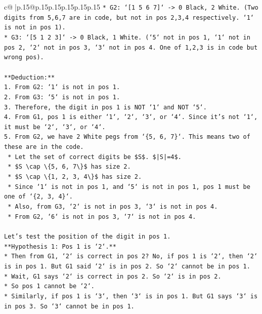\documentclass{article}
\begin{document}
{\begin{supertabular}{c@{$\;$}|p{.15\linewidth}@{}p{.15\linewidth}p{.15\linewidth}p{.15\linewidth}p{.15\linewidth}p{.15\linewidth}}
{{{\texttt{*   G2: `{[}1 5 6 7{]}` {-}> 0 Black, 2 White. (Two digits from 5,6,7 are in code, but not in pos 2,3,4 respectively. `1` is not in pos 1).} \\
\texttt{*   G3: `{[}5 1 2 3{]}` {-}> 0 Black, 1 White. (`5` not in pos 1, `1` not in pos 2, `2` not in pos 3, `3` not in pos 4. One of 1,2,3 is in code but wrong pos).} \\
\\ 
\texttt{**Deduction:**} \\
\texttt{1.  From G2: `1` is not in pos 1.} \\
\texttt{2.  From G3: `5` is not in pos 1.} \\
\texttt{3.  Therefore, the digit in pos 1 is NOT `1` and NOT `5`.} \\
\texttt{4.  From G1, pos 1 is either `1`, `2`, `3`, or `4`. Since it's not `1`, it must be `2`, `3`, or `4`.} \\
\texttt{5.  From G2, we have 2 White pegs from `\{5, 6, 7\}`. This means two of these are in the code.} \\
\texttt{    *   Let the set of correct digits be \$S\$. \$|S|=4\$.} \\
\texttt{    *   \$S \textbackslash{}cap \textbackslash{}\{5, 6, 7\textbackslash{}\}\$ has size 2.} \\
\texttt{    *   \$S \textbackslash{}cap \textbackslash{}\{1, 2, 3, 4\textbackslash{}\}\$ has size 2.} \\
\texttt{    *   Since `1` is not in pos 1, and `5` is not in pos 1, pos 1 must be one of `\{2, 3, 4\}`.} \\
\texttt{    *   Also, from G3, `2` is not in pos 3, `3` is not in pos 4.} \\
\texttt{    *   From G2, `6` is not in pos 3, `7` is not in pos 4.} \\
\\ 
\texttt{Let's test the position of the digit in pos 1.} \\
\texttt{**Hypothesis 1: Pos 1 is `2`.**} \\
\texttt{*   Then from G1, `2` is correct in pos 2? No, if pos 1 is `2`, then `2` is in pos 1. But G1 said `2` is in pos 2. So `2` cannot be in pos 1.} \\
\texttt{*   Wait, G1 says `2` is correct in pos 2. So `2` is in pos 2.} \\
\texttt{*   So pos 1 cannot be `2`.} \\
\texttt{*   Similarly, if pos 1 is `3`, then `3` is in pos 1. But G1 says `3` is in pos 3. So `3` cannot be in pos 1.} \\
}}}
\end{supertabular}}
\end{document}
